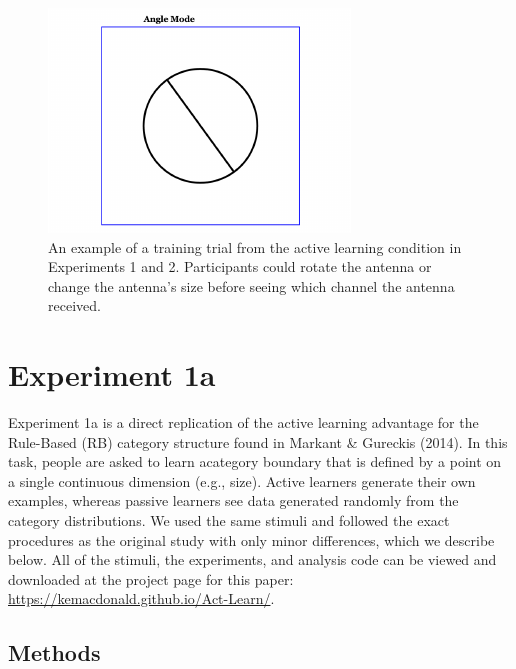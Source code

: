 \documentclass[10pt, letterpaper]{article}
\newenvironment{CodeChunk}{}{}
\begin{document}
\begin{CodeChunk}
\begin{figure}[t]

{\centering \includegraphics{figs/stimuli_exp1-1} 

}

\caption[An example of a training trial from the active learning condition in Experiments 1 and 2]{An example of a training trial from the active learning condition in Experiments 1 and 2. Participants could rotate the antenna or change the antenna's size before seeing which channel the antenna received.}\label{fig:stimuli_exp1}
\end{figure}
\end{CodeChunk}

\section{Experiment 1a}\label{experiment-1a}

Experiment 1a is a direct replication of the active learning advantage
for the Rule-Based (RB) category structure found in Markant \& Gureckis
(2014). In this task, people are asked to learn acategory boundary that
is defined by a point on a single continuous dimension (e.g., size).
Active learners generate their own examples, whereas passive learners
see data generated randomly from the category distributions. We used the
same stimuli and followed the exact procedures as the original study
with only minor differences, which we describe below. All of the
stimuli, the experiments, and analysis code can be viewed and downloaded
at the project page for this paper:
\url{https://kemacdonald.github.io/Act-Learn/}.

\subsection{Methods}\label{methods}
\end{document}
